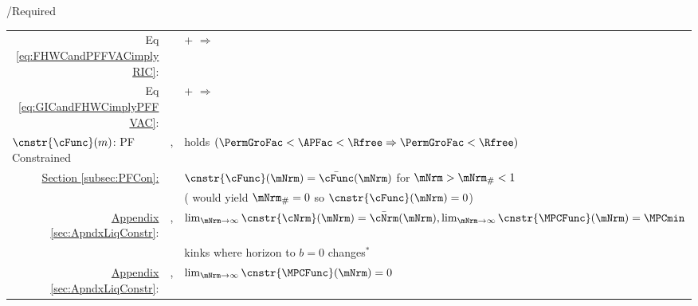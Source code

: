 \documentclass[\econtexRoot/BufferStockTheory]{subfiles}
\providecommand{\TblName}{}
\renewcommand{\TblName}{Required}
\begin{document}
\begin{verbatimwrite}{\TableDir/\TblName}
\begin{table}
{\begin{tabular}{|l|l|l|}
        \\ \multicolumn{1}{|r|}{Eq \eqref{eq:FHWCandPFFVACimplyRIC}:}                                                                              &                                         & {\PFFVAC}+{\FHWC} $\Rightarrow$ {\RIC}         
        \\ \multicolumn{1}{|r|}{{Eq \eqref{eq:GICandFHWCimplyPFFVAC}}:}                                                                              &                                         & {\GICRaw}+{\FHWC} $\Rightarrow$ {\PFFVAC}         
        \\ \hline\hline \multicolumn{1}{|l|}{$\cnstr{\cFunc}(m)$: PF Constrained}                                              & \cncl{\GICRaw}, \RIC                    & {\FHWC} holds $(\PermGroFac < \APFac < \Rfree \Rightarrow \PermGroFac < \Rfree)$
        \\
        \multicolumn{1}{|r|}{\hyperlink{PF-Constrained-Solution}{Section \ref{subsec:PFCon}:}}                &                                         & $\cnstr{\cFunc}(\mNrm)=\bar{\cFunc}(\mNrm)$ for $\mNrm > \mNrm_{\#} < 1$
        \\                                                                                                                        &                                         & (\cncl{\RIC} would yield $\mNrm_{\#}=0$ so $\cnstr{\cFunc}(\mNrm)=0$)
        \\ \cline{2-3}  \multicolumn{1}{|r|}{\hyperlink{ApndxLiqConstr}{Appendix \ref{sec:ApndxLiqConstr}}:} & \GICRaw,\RIC                            & $\lim_{\mNrm \rightarrow \infty} \cnstr{\cNrm}(\mNrm)=\bar{\cNrm}(\mNrm), \lim_{\mNrm \rightarrow \infty} \cnstr{\MPCFunc}(\mNrm)=\MPCmin$                                                                                                                                                                       
        \\                                                                                                                        &                                         & kinks where horizon to $b=0$ changes$^{\ast}$
        \\ \cline{2-3}\multicolumn{1}{|r|}{\hyperlink{ApndxLiqConstr}{Appendix \ref{sec:ApndxLiqConstr}}:}  & \GICRaw,\cncl{\RIC}                     & $\lim_{\mNrm \rightarrow \infty}  \cnstr{\MPCFunc}(\mNrm)=0$

\end{tabular}}
\end{table}
\end{verbatimwrite}
\end{document}
